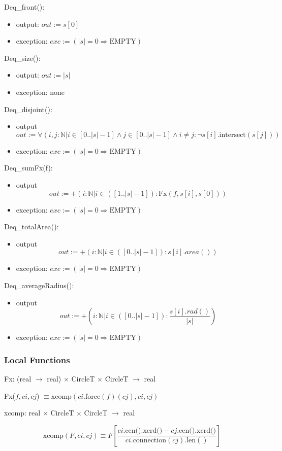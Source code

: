 \documentclass[12pt,fleqn]{article}
\begin{document}
\noindent Deq\_front():
\begin{itemize}
\item output: $out := s[0]$
\item exception: $exc := (|s| = 0 \Rightarrow \mbox{EMPTY})$
\end{itemize}

\noindent Deq\_size():
\begin{itemize}
\item output: $out := | s |$
\item exception: none
\end{itemize}

\noindent Deq\_disjoint():
\begin{itemize}
\item output $$out := \forall(i, j:\mathbb{N} | i \in [0 .. |s| -1] \wedge j \in [0 .. |s| -1] \wedge i \neq j:\neg  
s[i].\mbox{intersect}(s[j]))$$
\item exception: $exc := (|s| = 0 \Rightarrow \mbox{EMPTY})$
\end{itemize}

\noindent Deq\_sumFx(f):
\begin{itemize}
\item output $$out := +(i: \mathbb{N} | i \in ([1 .. |s|-1]):
  \mbox{Fx}(f, s[i], s[0]))$$
\item exception: $exc := (|s| = 0 \Rightarrow \mbox{EMPTY})$
\end{itemize}

\noindent Deq\_totalArea():
\begin{itemize}
\item output $$out := +(i: \mathbb{N} | i \in ([0 .. |s|-1]):
  s[i].area())$$
\item exception: $exc := (|s| = 0 \Rightarrow \mbox{EMPTY})$
\end{itemize}

\noindent Deq\_averageRadius():
\begin{itemize}
\item output $$out := +(i: \mathbb{N} | i \in ([0 .. |s|-1]):
  \frac{s[i].rad()}{|s|})$$
\item exception: $exc := (|s| = 0 \Rightarrow \mbox{EMPTY})$
\end{itemize}

\subsubsection*{Local Functions}
Fx: (real $\rightarrow$ real) $\times$ CircleT $\times$ CircleT $\rightarrow$ real

\noindent Fx($f, ci, cj$) $\equiv \mbox{xcomp}(ci.\mbox{force}(f) (cj), ci, cj)$
~\newline

\noindent xcomp: real $\times$ CircleT $\times$ CircleT $\rightarrow$ real
~\newline

\noindent $$\mbox{xcomp}(F, ci, cj)
\equiv F \left [ 
\frac{ci.\mbox{cen()}.\mbox{xcrd()} -
  cj.\mbox{cen()}.\mbox{xcrd()}} {ci.\mbox{connection}(cj).\mbox{len}()}
\right ]$$
\end{document}
